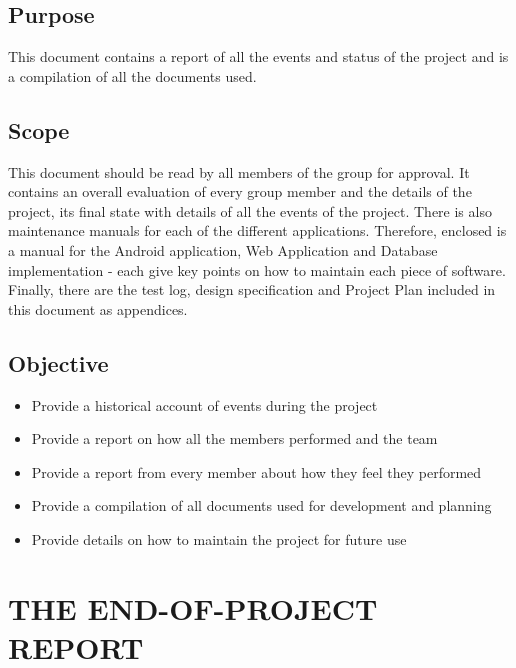 \documentclass[12pt]{article}
\begin{document}
\subsection{Purpose}
This document contains a report of all the events and status of the project and is a compilation of all the documents used.
\subsection{Scope}
This document should be read by all members of the group for approval. It contains an overall evaluation of every group member and the details of the project, its final state with details of all the events of the project. There is also maintenance manuals for each of the different applications. Therefore, enclosed is a manual for the Android application, Web Application and Database implementation - each give key points on how to maintain each piece of software. Finally, there are the test log, design specification and Project Plan included in this document as appendices. 
\subsection{Objective}
\begin{itemize}
\item Provide a historical account of events during the project
\item Provide a report on how all the members performed and the team
\item Provide a report from every member about how they feel they performed
\item Provide a compilation of all documents used for development and planning
\item Provide details on how to maintain the project for future use
\end{itemize}
\newpage
\section{THE END-OF-PROJECT REPORT}
\end{document}
